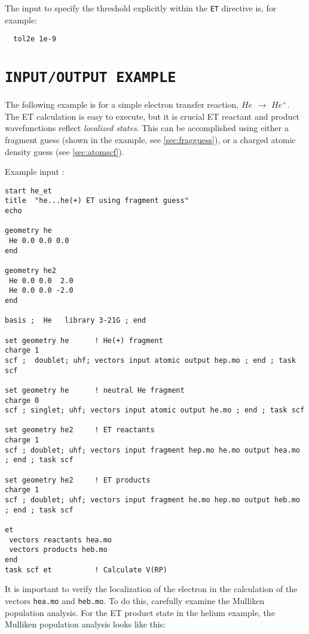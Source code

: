 The input to specify the threshold explicitly within the \verb+ET+
directive is, for example:

\begin{verbatim}
  tol2e 1e-9
\end{verbatim}

\section{{\tt INPUT/OUTPUT EXAMPLE}}

The following example is for a simple electron transfer reaction, $He_{}$ $\rightarrow$ $He^{ +}$.
The ET calculation is easy to execute, but it is crucial ET reactant and product
wavefunctions reflect {\em localized states}. This can be accomplished
using either a fragment guess (shown in the example, see \ref{sec:fragguess}), or a charged atomic
density guess (see \ref{sec:atomscf}).

Example input :
\begin{verbatim}
start he_et
title  "he...he(+) ET using fragment guess"
echo

geometry he
 He 0.0 0.0 0.0
end

geometry he2
 He 0.0 0.0  2.0
 He 0.0 0.0 -2.0
end

basis ;  He   library 3-21G ; end

set geometry he      ! He(+) fragment
charge 1
scf ;  doublet; uhf; vectors input atomic output hep.mo ; end ; task scf

set geometry he      ! neutral He fragment
charge 0
scf ; singlet; uhf; vectors input atomic output he.mo ; end ; task scf

set geometry he2     ! ET reactants
charge 1
scf ; doublet; uhf; vectors input fragment hep.mo he.mo output hea.mo ; end ; task scf

set geometry he2     ! ET products
charge 1
scf ; doublet; uhf; vectors input fragment he.mo hep.mo output heb.mo ; end ; task scf

et
 vectors reactants hea.mo 
 vectors products heb.mo
end
task scf et          ! Calculate V(RP)

\end{verbatim}
It is important to verify the localization of the electron in the calculation 
of the vectors \verb+hea.mo+ and \verb+heb.mo+. To do this, carefully examine the Mulliken population
analysis.  For the ET product state in the helium example, the Mulliken population
analysis looks like this:

